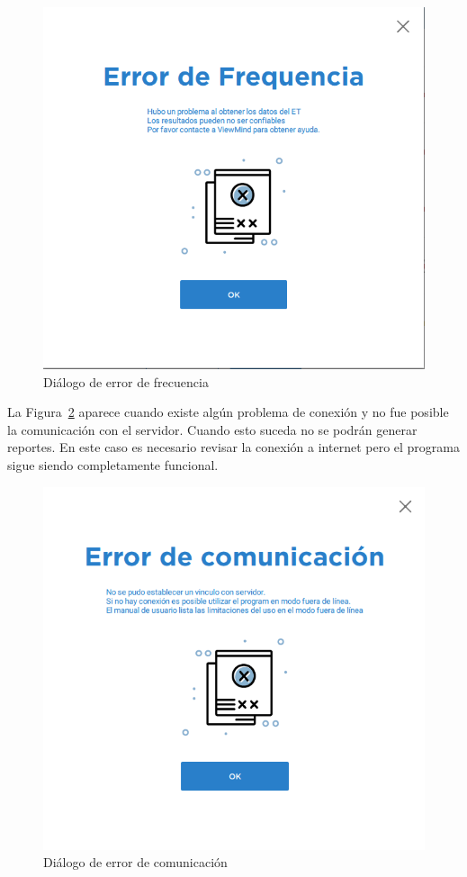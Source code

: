 \documentclass[a4paper,10pt]{article}
\begin{document}
\begin{figure}[!h]
\centering
\includegraphics[scale = 0.3]{freq_error.png}
\caption{Diálogo de error de frecuencia}
\label{fig_freq_err}
\end{figure}

La Figura~\ref{fig_comm_err} aparece cuando existe algún problema de conexión y no fue posible la comunicación con el servidor. Cuando esto suceda no se podrán generar reportes. En este caso es necesario revisar la conexión a internet pero el programa sigue siendo completamente funcional. 

\begin{figure}[!h]
\centering
\includegraphics[scale = 0.3]{comm_error.png}
\caption{Diálogo de error de comunicación}
\label{fig_comm_err}
\end{figure}
\end{document}
